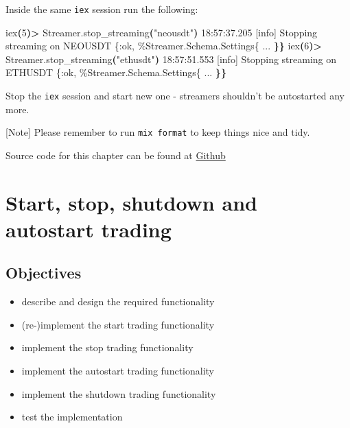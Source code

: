 \documentclass[
]{book}
\newenvironment{Shaded}{\begin{snugshade}}{\end{snugshade}}
\newcommand{\ErrorTok}[1]{\textcolor[rgb]{0.64,0.00,0.00}{\textbf{#1}}}
\newcommand{\ExtensionTok}[1]{#1}
\newcommand{\KeywordTok}[1]{\textcolor[rgb]{0.13,0.29,0.53}{\textbf{#1}}}
\newcommand{\NormalTok}[1]{#1}
\newcommand{\OperatorTok}[1]{\textcolor[rgb]{0.81,0.36,0.00}{\textbf{#1}}}
\newcommand{\StringTok}[1]{\textcolor[rgb]{0.31,0.60,0.02}{#1}}
\providecommand{\tightlist}{%
  \setlength{\itemsep}{0pt}\setlength{\parskip}{0pt}}
\begin{document}
Inside the same \texttt{iex} session run the following:

\begin{Shaded}
\begin{Highlighting}[]
\ExtensionTok{iex}\ErrorTok{(}\ExtensionTok{5}\KeywordTok{)}\OperatorTok{\textgreater{}}\NormalTok{ Streamer.stop\_streaming}\KeywordTok{(}\StringTok{"neousdt"}\KeywordTok{)} 
\ExtensionTok{18:57:37.205}\NormalTok{ [info]  Stopping streaming on NEOUSDT}
\ExtensionTok{\{:ok,}
 \ExtensionTok{\%Streamer.Schema.Settings\{}
   \ExtensionTok{...}
 \ErrorTok{\}\}}
\ExtensionTok{iex}\ErrorTok{(}\ExtensionTok{6}\KeywordTok{)}\OperatorTok{\textgreater{}}\NormalTok{ Streamer.stop\_streaming}\KeywordTok{(}\StringTok{"ethusdt"}\KeywordTok{)}
\ExtensionTok{18:57:51.553}\NormalTok{ [info]  Stopping streaming on ETHUSDT}
\ExtensionTok{\{:ok,}
 \ExtensionTok{\%Streamer.Schema.Settings\{}
   \ExtensionTok{...}
 \ErrorTok{\}\}}
\end{Highlighting}
\end{Shaded}

Stop the \texttt{iex} session and start new one - streamers shouldn't be autostarted any more.

{[}Note{]} Please remember to run \texttt{mix\ format} to keep things nice and tidy.

Source code for this chapter can be found at \href{https://github.com/frathon/create-a-cryptocurrency-trading-bot-in-elixir-source-code/tree/chapter_11}{Github}

\hypertarget{start-stop-shutdown-and-autostart-trading}{%
\chapter{Start, stop, shutdown and autostart trading}\label{start-stop-shutdown-and-autostart-trading}}

\hypertarget{objectives-11}{%
\section{Objectives}\label{objectives-11}}

\begin{itemize}
\tightlist
\item
  describe and design the required functionality
\item
  (re-)implement the start trading functionality
\item
  implement the stop trading functionality
\item
  implement the autostart trading functionality
\item
  implement the shutdown trading functionality
\item
  test the implementation
\end{itemize}
\end{document}
